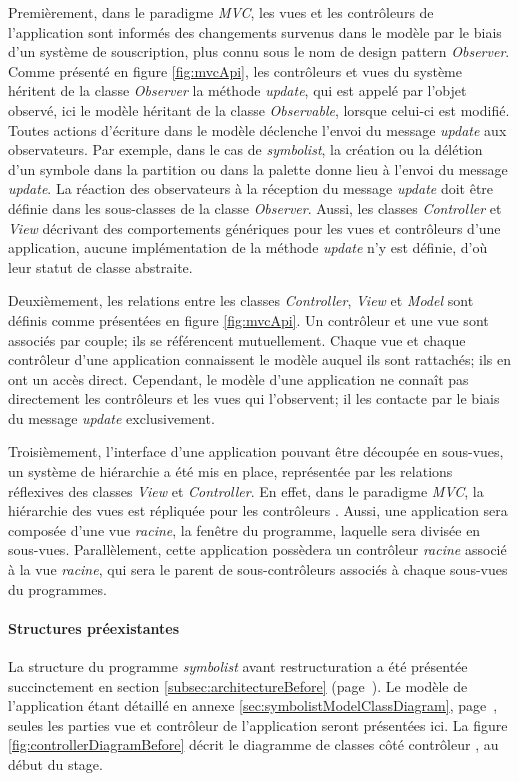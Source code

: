 Premièrement, dans le paradigme \textit{MVC}, les vues et les contrôleurs de l'application sont informés des changements survenus dans le modèle par le biais d'un système de souscription, plus connu sous le nom de design pattern \textit{Observer}. Comme présenté en figure \ref{fig:mvcApi}, les contrôleurs et vues du système héritent de la classe \textit{Observer} la méthode \textit{update}, qui est appelé par l'objet observé, ici le modèle héritant de la classe \textit{Observable}, lorsque celui-ci est modifié.
Toutes actions d'écriture dans le modèle déclenche l'envoi du message \textit{update} aux observateurs. Par exemple, dans le cas de \textit{symbolist}, la création ou la délétion d'un symbole dans la partition ou dans la palette donne lieu à l'envoi du message \textit{update}.
La réaction des observateurs à la réception du message \textit{update} doit être définie dans les sous-classes de la classe \textit{Observer}. Aussi, les classes \textit{Controller} et \textit{View} décrivant des comportements génériques pour les vues et contrôleurs d'une application, aucune implémentation de la méthode \textit{update} n'y est définie, d'où leur statut de classe abstraite.

Deuxièmement, les relations entre les classes \textit{Controller}, \textit{View} et \textit{Model} sont définis comme présentées en figure \ref{fig:mvcApi}. Un contrôleur et une vue sont associés par couple; ils se référencent mutuellement. Chaque vue et chaque contrôleur d'une application connaissent le modèle auquel ils sont rattachés; ils en ont un accès direct. Cependant, le modèle d'une application ne connaît pas directement les contrôleurs et les vues qui l'observent; il les contacte par le biais du message \textit{update} exclusivement.

Troisièmement, l'interface d'une application pouvant être découpée en sous-vues, un système de hiérarchie a été mis en place, représentée par les relations réflexives des classes \textit{View} et \textit{Controller}. En effet, dans le paradigme \textit{MVC}, la hiérarchie des vues est répliquée pour les contrôleurs \cite{krasner1988}. Aussi, une application sera composée d'une vue \textit{racine}, la fenêtre du programme, laquelle sera divisée en sous-vues. Parallèlement, cette application possèdera un contrôleur \textit{racine} associé à la vue \textit{racine}, qui sera le parent de sous-contrôleurs associés à chaque sous-vues du programmes.

\paragraph{Structures préexistantes} La structure du programme \textit{symbolist} avant restructuration a été présentée succinctement en section \ref{subsec:architectureBefore} (page~\pageref{subsec:architectureBefore}). Le modèle de l'application étant détaillé en annexe \ref{sec:symbolistModelClassDiagram}, page~\pageref{sec:symbolistModelClassDiagram}, seules les parties vue et contrôleur de l'application seront présentées ici.
La figure \ref{fig:controllerDiagramBefore} décrit le diagramme de classes \og côté contrôleur \fg, au début du stage.

